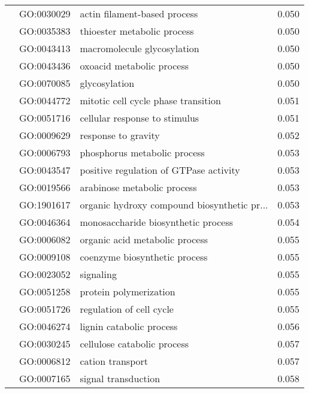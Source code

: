 \begin{longtable}{lllr}
   & GO:0030029 &                 actin filament-based process &         0.050 \\
   & GO:0035383 &                  thioester metabolic process &         0.050 \\
   & GO:0043413 &                  macromolecule glycosylation &         0.050 \\
   & GO:0043436 &                    oxoacid metabolic process &         0.050 \\
   & GO:0070085 &                                glycosylation &         0.050 \\
   & GO:0044772 &          mitotic cell cycle phase transition &         0.051 \\
   & GO:0051716 &                cellular response to stimulus &         0.051 \\
   & GO:0009629 &                          response to gravity &         0.052 \\
   & GO:0006793 &                 phosphorus metabolic process &         0.053 \\
   & GO:0043547 &       positive regulation of GTPase activity &         0.053 \\
   & GO:0019566 &                  arabinose metabolic process &         0.053 \\
   & GO:1901617 &  organic hydroxy compound biosynthetic pr... &         0.053 \\
   & GO:0046364 &          monosaccharide biosynthetic process &         0.054 \\
   & GO:0006082 &               organic acid metabolic process &         0.055 \\
   & GO:0009108 &                coenzyme biosynthetic process &         0.055 \\
   & GO:0023052 &                                    signaling &         0.055 \\
   & GO:0051258 &                       protein polymerization &         0.055 \\
   & GO:0051726 &                     regulation of cell cycle &         0.055 \\
   & GO:0046274 &                     lignin catabolic process &         0.056 \\
   & GO:0030245 &                  cellulose catabolic process &         0.057 \\
   & GO:0006812 &                             cation transport &         0.057 \\
   & GO:0007165 &                          signal transduction &         0.058 \\

\end{longtable}
